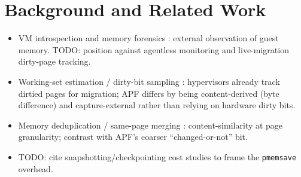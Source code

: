 \documentclass[conference]{IEEEtran}
\begin{document}
\section{Background and Related Work}
\begin{itemize}
  \item VM introspection and memory forensics \cite{garfinkel2003vmi}: external
        observation of guest memory. TODO: position against agentless
        monitoring and live-migration dirty-page tracking.
  \item Working-set estimation / dirty-bit sampling \cite{TODO_working_set_estimation}:
        hypervisors already track dirtied pages for migration; APF differs by
        being content-derived (byte difference) and capture-external rather than
        relying on hardware dirty bits.
  \item Memory deduplication / same-page merging \cite{TODO_ksm_dedup}:
        content-similarity at page granularity; contrast with APF's coarser
        ``changed-or-not'' bit.
  \item TODO: cite snapshotting/checkpointing cost studies to frame the
        \texttt{pmemsave} overhead.
\end{itemize}

\end{document}
